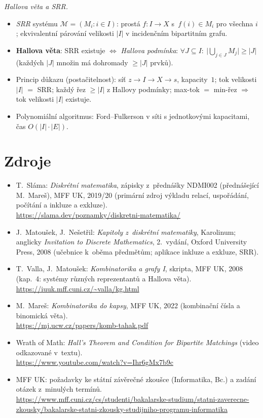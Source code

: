 \documentclass[11pt,a4paper]{article}
\newcommand{\Mcal}{\mathcal{M}}
\begin{document}
\begin{poznamka}
\smallskip
\emph{Hallova věta a SRR.}
\begin{itemize}
  \item \emph{SRR} systému $\Mcal=(M_i:i\in I)$: prostá $f\colon I\to X$ s~$f(i)\in M_i$ pro všechna $i$; ekvivalentní párování velikosti $|I|$ v incidenčním bipartitním grafu.
  \item \textbf{Hallova věta}: SRR existuje $\iff$ \emph{Hallova podmínka}: $\forall J\subseteq I:\ \bigl|\bigcup_{j\in J}M_j\bigr|\ge|J|$ (každých $|J|$ množin má dohromady $\ge|J|$ prvků).
  \item Princip důkazu (postačitelnost): síť $z\to I\to X\to s$, kapacity~$1$; tok velikosti $|I|$ $=$ SRR; každý řez $\ge|I|$ z Hallovy podmínky; max-tok $=$ min-řez $\Rightarrow$ tok velikosti $|I|$ existuje.
  \item Polynomiální algoritmus: Ford--Fulkerson v síti s jednotkovými kapacitami, čas $O(|I|\cdot|E|)$.
\end{itemize}
\end{poznamka}

\section*{Zdroje}

{\raggedright
\begin{itemize}
  \item T.~Sláma: \emph{Diskrétní matematika}, zápisky z~přednášky NDMI002 (přednášející M.~Mareš), MFF UK, 2019/20 (primární zdroj výkladu relací, uspořádání, počítání a inkluze a exkluze).\\ \url{https://slama.dev/poznamky/diskretni-matematika/}
  \item J.~Matoušek, J.~Nešetřil: \emph{Kapitoly z~diskrétní matematiky}, Karolinum; anglicky \emph{Invitation to Discrete Mathematics}, 2.~vydání, Oxford University Press, 2008 (učebnice k~oběma předmětům; aplikace inkluze a exkluze, SRR).
  \item T.~Valla, J.~Matoušek: \emph{Kombinatorika a grafy I}, skripta, MFF UK, 2008 (kap.~4: systémy různých reprezentantů a Hallova věta).\\ \url{https://iuuk.mff.cuni.cz/~valla/kg.html}
  \item M.~Mareš: \emph{Kombinatorika do kapsy}, MFF UK, 2022 (kombinační čísla a binomická věta).\\ \url{https://mj.ucw.cz/papers/komb-tahak.pdf}
  \item Wrath of Math: \emph{Hall's Theorem and Condition for Bipartite Matchings} (video odkazované v~textu).\\ \url{https://www.youtube.com/watch?v=Ihr6gMx7b9c}
  \item MFF UK: požadavky ke státní závěrečné zkoušce (Informatika, Bc.) a zadání otázek z~minulých termínů.\\ \url{https://www.mff.cuni.cz/cs/studenti/bakalarske-studium/statni-zaverecne-zkousky/bakalarske-statni-zkousky-studijniho-programu-informatika}
\end{itemize}
\par}
\end{document}
